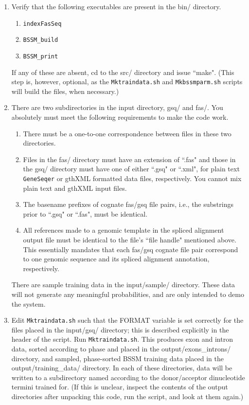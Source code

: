 \documentclass[11pt]{article}
\begin{document}
\begin{enumerate}
  \item
  Verify that the following executables are present in the bin/ directory.

  \begin{enumerate}
    \item
    \texttt{indexFasSeq}
    \item
    \texttt{BSSM\_build}
    \item
    \texttt{BSSM\_print}
  \end{enumerate}

  If any of these are absent, cd to the src/ directory and issue ``make".
  (This step is, however, optional, as the \texttt{Mktraindata.sh} and
  \texttt{Mkbssmparm.sh} scripts will build the files, when necessary.)

  \item
  There are two subdirectories in the
  input directory, gsq/ and fas/.  You absolutely must meet the
  following requirements to make the code work.

  \begin{enumerate}
    \item
    There must be a one-to-one correspondence between files in
    these two directories.
    \item
    Files in the fas/ directory must have an extension of ``.fas"
    and those in the gsq/ directory must have one of either ``.gsq"
    or ``.xml", for plain text \texttt{GeneSeqer} or gthXML formatted
    data files, respectively.  You cannot mix plain text and gthXML
    input files.
    \item
    The basename prefixes of cognate fas/gsq file pairs, i.e., the
    substrings prior to ``.gsq" or ``.fas", must be identical.
    \item
    All references made to a genomic template in the spliced alignment
    output file must be identical to the file's ``file handle"
    mentioned above.  This essentially mandates that each fas/gsq
    cognate file pair correspond to one genomic sequence and its
    spliced alignment annotation, respectively.
  \end{enumerate}

  There are sample training data in the input/sample/ directory.  These
  data will not generate any meaningful probabilities, and are
  only intended to demo the system.
   
  \item
  Edit \texttt{Mktraindata.sh} such that the FORMAT variable is
  set correctly for the files placed in the input/gsq/ directory; this is
  described explicitly in the header of the script.
  Run \texttt{Mktraindata.sh}.  This produces exon and intron data, sorted
  according to phase and placed in the output/exons\_introns/ directory,
  and sampled, phase-sorted BSSM training data placed in the
  output/training\_data/ directory.  In each of these directories, data
  will be written to a subdirectory named according to the
  donor/acceptor dinucleotide termini trained for.  (If this is
  unclear, inspect the contents of the output directories after
  unpacking this code, run the script, and look at them again.)


\end{enumerate}
\end{document}
